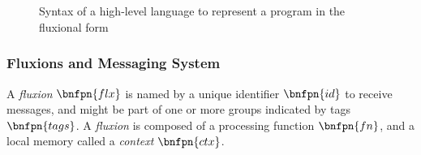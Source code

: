 \begin{figure}[h]
\vspace{-0.6\baselineskip}
\begin{bnf*}
      { \bnfor {} \bnfsp {} \bnfsp {}}\\
          { \bnfsp {} \bnfsp {} \bnfsp {} \bnfsp {} \bnfsp {} \bnfsp {} \bnfsp {}}\\
         {\bnfts{\texttt{\&}} \bnfsp {} \bnfor {}}\\
      { \bnfor {} \bnfor {} \bnfsp {} \bnfsp {}}\\
       { \bnfsp {} }\\
         {}\\
          {\bnfts{\texttt{\{}}  \bnfts{\texttt{\}}}}\\
          {\bnfts{\texttt{[}}  \bnfts{\texttt{]}}}\\
         { \bnfor {} \bnfsp \bnfts{,} \bnfsp {}}\\
         {\bnfts{\texttt{>}\texttt{>}} \bnfor \bnfts{\texttt{-}\texttt{>}}}\\
           {}\\
           {  }\\
\end{bnf*}
\vspace{-2.5\baselineskip}
\caption{Syntax of a high-level language to represent a program in the fluxional form}
\label{fig:flx-lang}
\end{figure}

\subsubsection{Fluxions and Messaging System}

A \textit{fluxion} $\bnfpn{flx}$ is named by a unique identifier $\bnfpn{id}$ to receive messages, and might be part of one or more groups indicated by tags $\bnfpn{tags}$.
A \textit{fluxion} is composed of a processing function $\bnfpn{fn}$, and a local memory called a \textit{context} $\bnfpn{ctx}$.

